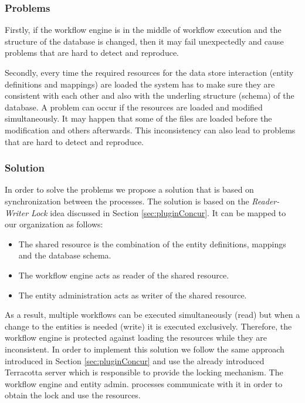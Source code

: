 \subsubsection{Problems}
Firstly, if the workflow engine is in the middle of workflow execution and the structure of the database is changed, then it may fail unexpectedly and cause problems that are hard to detect and reproduce. 

Secondly, every time the required resources for the data store interaction (entity definitions and mappings) are loaded the system has to make sure they are consistent with each other and also with the underling structure (schema) of the database. A problem can occur if the resources are loaded and modified simultaneously. It may happen that some of the files are loaded before the modification and others afterwards. This inconsistency can also lead to problems that are hard to detect and reproduce.

\subsubsection{Solution}

In order to solve the problems we propose a solution that is based on synchronization between the processes. The solution is based on the \textit{Reader-Writer Lock} idea \cite{lev2009scalable} discussed in Section \ref{sec:pluginConcur}. It can be mapped to our organization as follows:

\begin{itemize}
	\item The shared resource is the combination of the entity definitions, mappings and the database schema.
	\item The workflow engine acts as reader of the shared resource.
	\item The entity administration acts as writer of the shared resource.
\end{itemize}

As a result, multiple workflows can be executed simultaneously (read) but when a change to the entities is needed (write) it is executed exclusively. Therefore, the workflow engine is protected against loading the resources while they are inconsistent. In order to implement this solution we follow the same approach introduced in Section \ref{sec:pluginConcur} and use the already introduced Terracotta server which is responsible to provide the locking mechanism. The workflow engine and entity admin. processes communicate with it in order to obtain the lock and use the resources.

